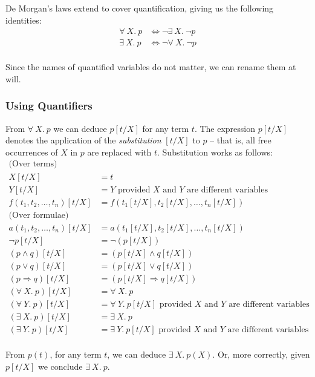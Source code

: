 \documentclass[a4paper,11pt,notitlepage,onecolumn]{article}
\newcommand{\Not}[1]%
{\neg{}#1}
\newcommand{\Conj}%
{\wedge}
\newcommand{\Disj}%
{\vee}
\newcommand{\Imp}%
{\Rightarrow}
\newcommand{\Eqv}%
{\Leftrightarrow}
\newcommand{\All}[2]%
{\forall\ #1.\ #2}
\newcommand{\Some}[2]%
{\exists\ #1.\ #2}
\begin{document}
De Morgan's laws extend to cover quantification, giving us the following
identities:
\begin{align*}
\All{X}{p}
& \Eqv \Not{\Some{X}{\Not{p}}} \\
\Some{X}{p}
& \Eqv \Not{\All{X}{\Not{p}}} \\
\end{align*}

Since the names of quantified variables do not matter, we can rename
them at will.

\subsubsection{Using Quantifiers}

From $\All{X}{p}$ we can deduce $p[t/X]$ for any term $t$.  The
expression $p[t/X]$ denotes the application of the \emph{substitution}
$[t/X]$ to $p$ -- that is, all free occurrences of $X$ in $p$ are
replaced with $t$.  Substitution works as follows:
\begin{align*}
\text{(Over terms)} \\
X[t/X]
& = t \\
Y[t/X]
& = Y \text{ provided $X$ and $Y$ are different variables} \\
f(t_1, t_2, \ldots, t_n)[t/X]
& = f(t_1[t/X], t_2[t/X], \ldots, t_n[t/X]) \\
\text{(Over formulae)} \\
a(t_1, t_2, \ldots, t_n)[t/X]
& = a(t_1[t/X], t_2[t/X], \ldots, t_n[t/X]) \\
\Not{p}[t/X]
& = \Not{(p[t/X])} \\
(p \Conj q)[t/X]
& = (p[t/X] \Conj q[t/X]) \\
(p \Disj q)[t/X]
& = (p[t/X] \Disj q[t/X]) \\
(p \Imp q)[t/X]
& = (p[t/X] \Imp q[t/X]) \\
(\All{X}{p})[t/X]
& = \All{X}{p} \\
(\All{Y}{p})[t/X]
& = \All{Y}{p[t/X]} \text{ provided $X$ and $Y$ are different variables} \\
(\Some{X}{p})[t/X]
& = \Some{X}{p} \\
(\Some{Y}{p})[t/X]
& = \Some{Y}{p[t/X]} \text{ provided $X$ and $Y$ are different variables} \\
\end{align*}

From $p(t)$, for any term $t$, we can deduce $\Some{X}{p(X)}$.  Or, more
correctly, given $p[t/X]$ we conclude $\Some{X}{p}$.
\end{document}
